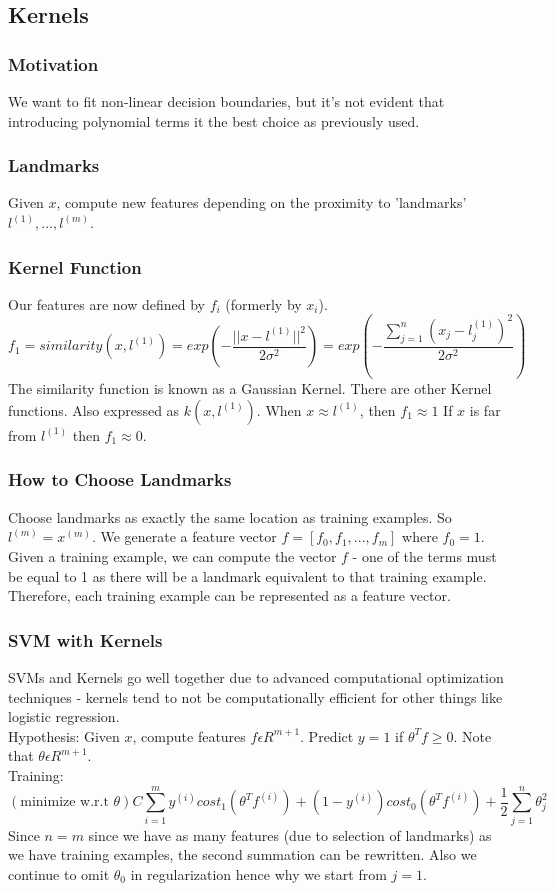 \documentclass[11pt,letterpaper]{article}
\begin{document}
\subsection{Kernels}
\subsubsection{Motivation}
We want to fit non-linear decision boundaries, but it's not evident that introducing polynomial terms it the best choice as previously used.
\subsubsection{Landmarks}
Given $x$, compute new features depending on the proximity to 'landmarks' $l^{(1)},...,l^{(m)}$.
\subsubsection{Kernel Function}
Our features are now defined by $f_i$ (formerly by $x_i$). 
$$f_1 = similarity(x, l^{(1)}) = exp(-\frac{||x-l^{(1)}||^2}{2\sigma^2}) = exp(-\frac{\sum_{j=1}^{n}(x_j-l_j^{(1)})^2}{2\sigma^2})$$
The similarity function is known as a Gaussian Kernel. There are other Kernel functions. Also expressed as $k(x, l^{(1)})$. When $x \approx l^{(1)}$, then $f_1 \approx 1$ If $x$ is far from $l^{(1)}$ then $f_1 \approx 0$.
\subsubsection{How to Choose Landmarks}
Choose landmarks as exactly the same location as training examples. So $l^{(m)} = x^{(m)}$. We generate a feature vector $ f = [f_0, f_1, ..., f_m]$ where $f_0 = 1$. Given a training example, we can compute the vector $f$ - one of the terms must be equal to 1 as there will be a landmark equivalent to that training example. Therefore, each training example can be represented as a feature vector.

\subsubsection{SVM with Kernels}
SVMs and Kernels go well together due to advanced computational optimization techniques - kernels tend to not be computationally efficient for other things like logistic regression. \\
Hypothesis: Given $x$, compute features $f \epsilon R^{m+1}$. Predict $y = 1$ if $\theta^Tf \geq 0$. Note that $\theta \epsilon R^{m+1}$.\\
Training:  $$ (\textrm{minimize w.r.t } \theta) C \sum_{i=1}^m y^{(i)}cost_1(\theta^Tf^{(i)}) + (1-y^{(i)})cost_0(\theta^Tf^{(i)}) + \frac{1}{2}\sum_{j=1}^{n}\theta_j^2$$
Since $ n = m $ since we have as many features (due to selection of landmarks) as we have training examples, the second summation can be rewritten. Also we continue to omit $\theta_0$ in regularization hence why we start from $j=1$.
\end{document}

